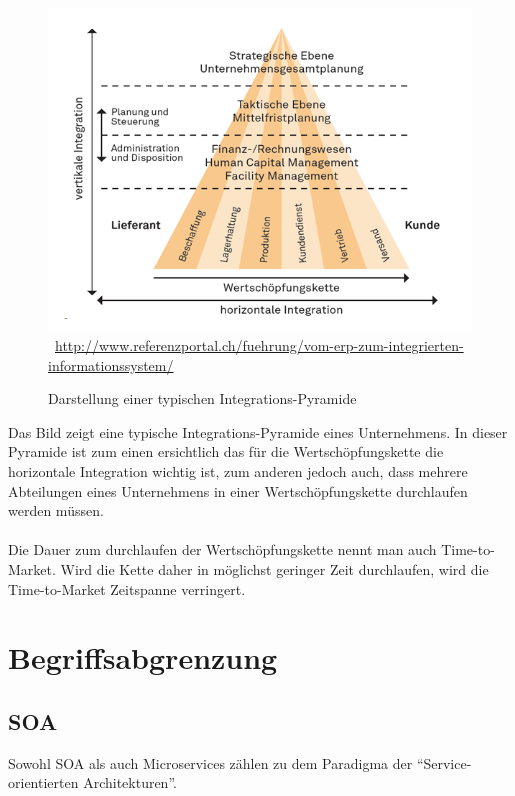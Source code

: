 \begin{figure}[htb]
    \centering 
    \includegraphics[width=\linewidth]{content/images/integrations-pyramide}\
    \quelle\url{http://www.referenzportal.ch/fuehrung/vom-erp-zum-integrierten-informationssystem/}
    \caption[Darstellung einer typischen Integrations-Pyramide]{Darstellung einer typischen Integrations-Pyramide\\}
    \label{fig:integrations-pyramide} 
\end{figure} 
Das Bild zeigt eine typische Integrations-Pyramide eines Unternehmens. In dieser Pyramide ist zum einen ersichtlich das für die Wertschöpfungskette die horizontale Integration wichtig ist, zum anderen jedoch auch, dass mehrere Abteilungen eines Unternehmens in einer Wertschöpfungskette durchlaufen werden müssen.
\\\\
Die Dauer zum durchlaufen der Wertschöpfungskette nennt man auch Time-to-Market. Wird die Kette daher in möglichst geringer Zeit durchlaufen, wird die Time-to-Market Zeitspanne verringert.

\section{Begriffsabgrenzung}
\label{sec:Begriffsabgrenzung}

\subsection*{SOA}
Sowohl SOA als auch Microservices zählen zu dem Paradigma der "`Service-orientierten Architekturen"'.

